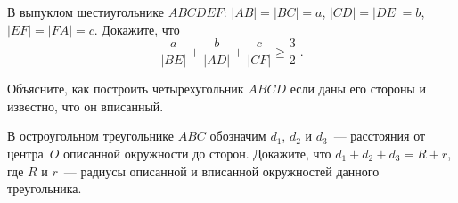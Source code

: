 \begin{problems}
\item
В выпуклом шестиугольнике $ABCDEF$: $|AB| = |BC| = a$, $|CD| = |DE| = b$,
$|EF| = |FA| = c$.
Докажите, что
\[
    \frac{a}{|BE|} + \frac{b}{|AD|} + \frac{c}{|CF|}
\geq
    \frac{3}{2}
\;.\]

\item
Объясните, как построить четырехугольник $ABCD$ если даны его стороны
и известно, что он вписанный.

\item
В остроугольном треугольнике $ABC$ обозначим $d_1$, $d_2$ и $d_3$~---
расстояния от центра~$O$ описанной окружности до сторон.
Докажите, что $d_1 + d_2 + d_3 = R + r$, где $R$ и $r$~--- радиусы описанной
и вписанной окружностей данного треугольника.

\end{problems}

